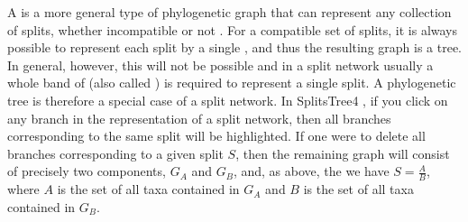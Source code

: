 \documentclass[11pt]{article}
\def\SplitsTree{{\sf SplitsTree4 }}
\begin{document}
A  is a more general type of phylogenetic graph
that can represent any collection of splits, whether incompatible or not
\cite{BandeltDress92}.
For a compatible set of splits, it is always possible to represent
each split by a single , and thus the resulting graph is a
tree.
In general, however, this will not be possible and in a split network
usually a whole band of  (also called
) is required to represent a single
split. A phylogenetic tree is therefore a special case of a split network.
In \SplitsTree, if you click on any branch in the representation of
a split network, then all branches corresponding to the same split will be
highlighted. If one were to delete all branches corresponding to a given split
$S$, then the remaining graph will consist of precisely two components,
$G_{A}$ and $G_{B}$, and, as above, the we have $S=\frac{A}{B}$, where
$A$ is the set of all taxa contained in $G_{A}$ and $B$ is the set of all
taxa contained in $G_{B}$.
\end{document}
